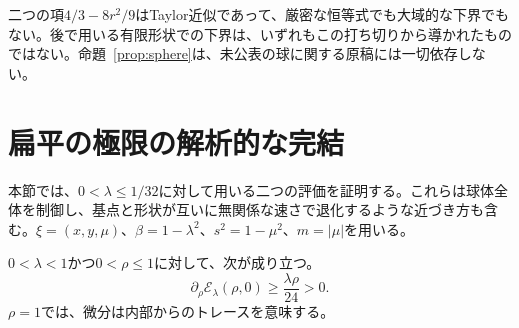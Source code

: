 二つの項$4/3-8r^2/9$はTaylor近似であって、厳密な恒等式でも大域的な下界でもない。後で用いる有限形状での下界は、いずれもこの打ち切りから導かれたものではない。命題~\ref{prop:sphere}は、未公表の球に関する原稿には一切依存しない。

\section{扁平の極限の解析的な完結}\label{sec:oblate_analytic}

本節では、$0<\lambda\le1/32$に対して用いる二つの評価を証明する。これらは球体全体を制御し、基点と形状が互いに無関係な速さで退化するような近づき方も含む。$\xi=(x,y,\mu)$、$\beta=1-\lambda^2$、$s^2=1-\mu^2$、$m=|\mu|$を用いる。

\begin{lemma}[赤道上の鏡映不等式]\label{lem:equatorial}
$0<\lambda<1$かつ$0<\rho\le1$に対して、次が成り立つ。
\begin{equation}\label{eq:equatorial_bound}
 \partial_\rho\mathcal E_\lambda(\rho,0)\ge\frac{\lambda\rho}{24}>0.
\end{equation}
$\rho=1$では、微分は内部からのトレースを意味する。
\end{lemma}
